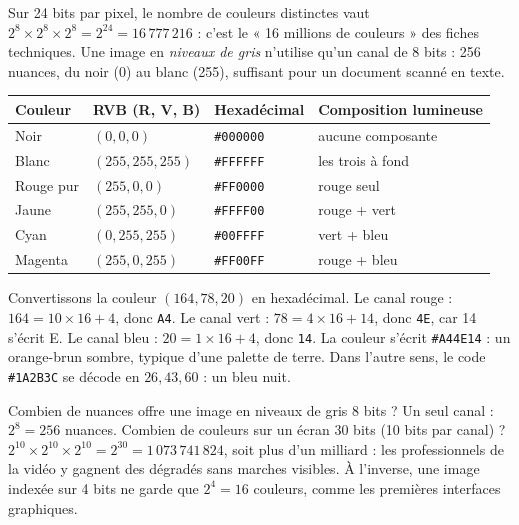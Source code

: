 \begin{propriete}
Sur 24 bits par pixel, le nombre de couleurs distinctes vaut $2^{8} \times 2^{8} \times 2^{8} = 2^{24} = 16\,777\,216$ : c'est le « 16 millions de couleurs » des fiches techniques. Une image en \emph{niveaux de gris} n'utilise qu'un canal de 8 bits : 256 nuances, du noir (0) au blanc (255), suffisant pour un document scanné en texte.
\end{propriete}

\begin{center}
\small
\begin{tabular}{L{2.6cm}C{3.2cm}C{2.6cm}L{4.4cm}}
\toprule
{}\textbf{Couleur} & \textbf{RVB (R, V, B)} & \textbf{Hexadécimal} & \textbf{Composition lumineuse}\\
\midrule
Noir & $(0, 0, 0)$ & \texttt{\#000000} & aucune composante\\
Blanc & $(255, 255, 255)$ & \texttt{\#FFFFFF} & les trois à fond\\
Rouge pur & $(255, 0, 0)$ & \texttt{\#FF0000} & rouge seul\\
Jaune & $(255, 255, 0)$ & \texttt{\#FFFF00} & rouge + vert\\
Cyan & $(0, 255, 255)$ & \texttt{\#00FFFF} & vert + bleu\\
Magenta & $(255, 0, 255)$ & \texttt{\#FF00FF} & rouge + bleu\\
\bottomrule
\end{tabular}
\label{ch6:tab:couleurs}
\end{center}

\begin{exemple}
Convertissons la couleur $(164, 78, 20)$ en hexadécimal. Le canal rouge : $164 = 10 \times 16 + 4$, donc \texttt{A4}. Le canal vert : $78 = 4 \times 16 + 14$, donc \texttt{4E}, car 14 s'écrit E. Le canal bleu : $20 = 1 \times 16 + 4$, donc \texttt{14}. La couleur s'écrit \texttt{\#A44E14} : un orange-brun sombre, typique d'une palette de terre. Dans l'autre sens, le code \texttt{\#1A2B3C} se décode en $26, 43, 60$ : un bleu nuit.
\end{exemple}

\begin{exemple}
Combien de nuances offre une image en niveaux de gris 8 bits ? Un seul canal : $2^{8} = 256$ nuances. Combien de couleurs sur un écran 30 bits (10 bits par canal) ? $2^{10} \times 2^{10} \times 2^{10} = 2^{30} = 1\,073\,741\,824$, soit plus d'un milliard : les professionnels de la vidéo y gagnent des dégradés sans marches visibles. À l'inverse, une image indexée sur 4 bits ne garde que $2^{4} = 16$ couleurs, comme les premières interfaces graphiques.
\end{exemple}

